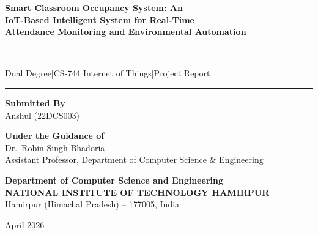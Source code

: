 \documentclass[12pt,a4paper]{article}
\begin{document}
\thispagestyle{empty}

\begin{titlepage}
\centering
\vspace*{15mm}

{\LARGE\bfseries Smart Classroom Occupancy System: An\\[4pt]
IoT-Based Intelligent System for Real-Time\\[4pt]
Attendance Monitoring and Environmental Automation}

\vspace{10mm}
\rule{0.6\linewidth}{0.4pt}\\[4pt]
{\large Dual Degree\enspace|\enspace CS-744 Internet of Things\enspace|\enspace Project Report}\\[2pt]
\rule{0.6\linewidth}{0.4pt}

\vspace{14mm}
{\large\textbf{Submitted By}}\\[6pt]
{\Large Anshul \quad (22DCS003)}

\vspace{10mm}
{\large\textbf{Under the Guidance of}}\\[6pt]
Dr.\ Robin Singh Bhadoria\\
{\small Assistant Professor, Department of Computer Science \& Engineering}

\vspace{14mm}
{\large\textbf{Department of Computer Science and Engineering}}\\[6pt]
{\Large\bfseries NATIONAL INSTITUTE OF TECHNOLOGY HAMIRPUR}\\[4pt]
{\small Hamirpur (Himachal Pradesh) -- 177005, India}

\vfill
{\large April 2026}
\end{titlepage}

\newpage
\thispagestyle{empty}
\tableofcontents
\newpage
\end{document}
